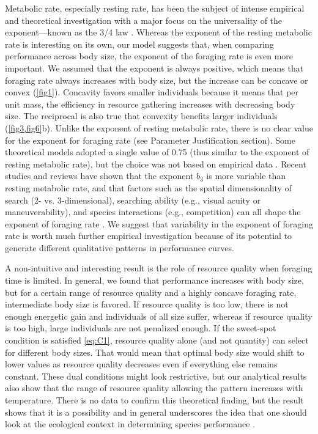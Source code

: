 Metabolic rate, especially resting rate, has been the subject of intense empirical and theoretical investigation with a major focus on  the universality of the exponent---known as the 3/4 law \citep{Peters1986,West1997, Kozlowski1997, Brown2004, Isaac2010}. 
Whereas the exponent of the resting metabolic rate is interesting on its own, our model suggests that, when comparing performance across body size, the exponent of the foraging rate is even more important.
We assumed that the exponent is always positive, which means that foraging rate always increases with body size, but the increase can be concave or convex (\cref{fig1}).
Concavity favors smaller individuals because it means that per unit mass, the efficiency in resource gathering increases with decreasing body size.
The reciprocal is also true that convexity benefits larger individuals (\cref{fig3,fig6}b). %
Unlike the exponent of resting metabolic rate, there is no clear value for the exponent for foraging rate (see Parameter Justification section). %
Some theoretical models adopted a single value of 0.75 (thus similar to the exponent of resting metabolic rate), but the choice was not based on empirical data \citep{Yodzis1992, Brown1993}.
Recent studies and reviews have shown that the exponent $b_3$  is more variable than resting metabolic rate, and that factors such as the spatial dimensionality of search (2- vs. 3-dimensional), searching ability (e.g., visual acuity or maneuverability), and species interactions (e.g., competition) can all shape the exponent of foraging rate \citep{Pawar2012, Kalinkat2015}.
We suggest that variability in the exponent of foraging rate is worth much further empirical investigation because of its potential to generate different qualitative patterns in performance curves.

A non-intuitive and interesting result is the role of resource quality when foraging time is limited.
In general, we found that performance increases with body size, but for a certain range of resource quality and a highly concave foraging rate, intermediate body size is favored.
If resource quality is too low, there is not enough energetic gain and individuals of all size suffer, whereas if resource quality is too high, large individuals are not penalized enough. %
If the sweet-spot condition is satisfied \cref{eq:C1}, resource quality alone (and not quantity) can select for different body sizes.
That would mean that optimal body size would shift to lower values as resource quality decreases even if everything else remains constant.
These dual conditions might look restrictive, but our analytical results also show that the range of resource quality allowing the pattern increases with temperature. 
There is no data to confirm this theoretical finding, but the result shows that it is a possibility and in general underscores the idea that one should look at the ecological context in determining species performance \citep{Sears2015}.

